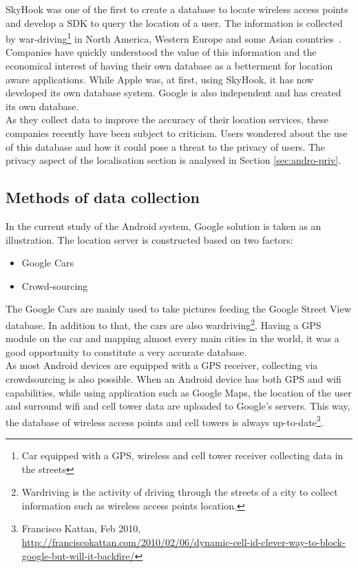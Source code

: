 SkyHook was one of the first to create a database to locate wireless access points and develop a SDK to query the location of a user.
The information is collected by war-driving\footnote{Car equipped with a GPS, wireless and cell tower receiver collecting data in the streets} in North America, Western Europe and some Asian countries~\cite{skyhook-coverage}.\\

Companies have quickly understood the value of this information and the economical interest of having their own database as a betterment for location aware applications.
While Apple was, at first, using SkyHook, it has now developed its own database system.
Google is also independent and has created its own database.\\

As they collect data to improve the accuracy of their location services, these companies recently have been subject to criticism.
Users wondered about the use of this database and how it could pose a threat to the privacy of users.
The privacy aspect of the localisation section is analysed in Section \ref{sec:andro-priv}.

\subsection{Methods of data collection}

In the current study of the Android system, Google solution is taken as an illustration.
The location server is constructed based on two factors:
\begin{itemize}
\item Google Cars
\item Crowd-sourcing
\end{itemize}

The Google Cars are mainly used to take pictures feeding the Google Street View database.
In addition to that, the cars are also wardriving\footnote{Wardriving is the activity of driving through the streets of a city to collect information such as wireless access points location.}.
Having a GPS module on the car and mapping almost every main cities in the world, it was a good opportunity to constitute a very accurate database.\\

As most Android devices are equipped with a GPS receiver, collecting via crowdsourcing is also possible.
When an Android device has both GPS and wifi capabilities, while using application such as Google Maps, the location of the user and surround wifi and cell tower data are uploaded to Google's servers.
This way, the database of wireless access points and cell towers is always up-to-date\footnote{Francisco Kattan, Feb 2010, \url{http://franciscokattan.com/2010/02/06/dynamic-cell-id-clever-way-to-block-google-but-will-it-backfire/}}.


